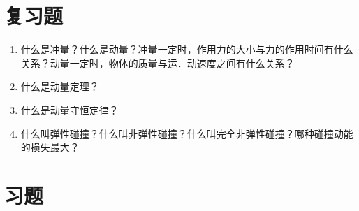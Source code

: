 \section*{复习题}
\begin{enumerate}
    \item 什么是冲量？什么是动量？冲量一定时，作用力的大小与力的作用时间有什么关系？动量一定时，物体的质量与运．动速度之间有什么关系？
    \item 什么是动量定理？
    \item 什么是动量守恒定律？
    \item 什么叫弹性碰撞？什么叫非弹性碰撞？什么叫完全非弹性碰撞？哪种碰撞动能的损失最大？
\end{enumerate}


\section*{习题}
